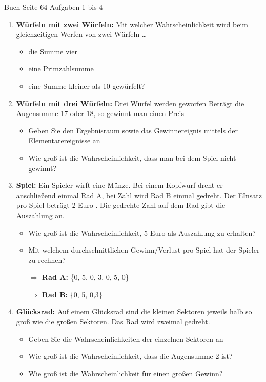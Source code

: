 \documentclass[11pt,a4paper,oneside]{article}
\begin{document}
	\begin{aufgabe}{Buch Seite 64 Aufgaben 1 bis 4 }
		\begin{enumerate}
			\item \textbf{Würfeln mit zwei Würfeln:} Mit welcher Wahrscheinlichkeit wird beim gleichzeitigen Werfen von zwei Würfeln \dots
			\begin{itemize}
				\item die Summe vier 
				\item eine Primzahlsumme 
				\item eine Summe kleiner als 10 gewürfelt? 
			\end{itemize}
			\item \textbf{Würfeln mit drei Würfeln:} Drei Würfel werden geworfen Beträgt die Augensumme 17 oder 18, so gewinnt man einen Preis
			\begin{itemize}
				\item Geben Sie den Ergebnisraum sowie das Gewinnereignis mittels der Elementarereignisse an 
				\item Wie groß ist die Wahrscheinlichkeit, dass man bei dem Spiel nicht gewinnt? 
			\end{itemize}
			\item \textbf{Spiel:} Ein Spieler wirft eine Münze. Bei einem Kopfwurf dreht er anschließend einmal Rad A, bei Zahl wird Rad B einmal gedreht. Der EInsatz pro Spiel beträgt 2 Euro . Die gedrehte Zahl auf dem Rad gibt die Auszahlung an.
			\begin{itemize}
				\item Wie groß ist die Wahrscheinlichkeit, 5 Euro als Auszahlung zu erhalten? 
				\item Mit welchem durchschnittlichen Gewinn/Verlust pro Spiel hat der Spieler zu rechnen? 
				\item [$\Rightarrow$] \textbf{Rad A:} \{0, 5, 0, 3, 0, 5, 0\}
				\item [$\Rightarrow$] \textbf{Rad B:} \{0, 5, 0,3\}
			\end{itemize}
			\item \textbf{Glücksrad:} Auf einem Glücksrad sind die kleinen Sektoren jeweils halb so groß wie die großen Sektoren. Das Rad wird zweimal gedreht. 
			\begin{itemize}
				\item Geben Sie die Wahrscheinlichkeiten der einzelnen Sektoren an
				\item Wie groß ist die Wahrscheinlichkeit, dass die Augensumme 2 ist? 
				\item Wie groß ist die Wahrscheinlichkeit für einen großen Gewinn? 

\end{itemize}
\end{enumerate}
\end{aufgabe}
\end{document}
